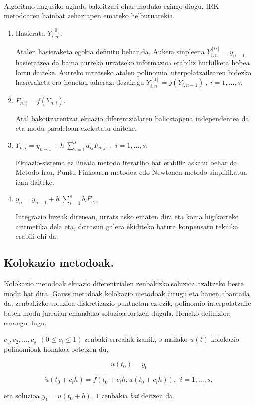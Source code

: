 \paragraph*{}Algoritmo nagusiko agindu bakoitzari ohar moduko egingo diogu, IRK metodoaren hainbat zehaztapen emateko helburuarekin.
\begin{enumerate}
\item Hasieratu  $Y_{i,n}^{[0]}$.

Atalen hasieraketa egokia definitu behar da. Aukera sinpleena $Y_{i,n}^{[0]}=y_{n-1}$ hasieratzea da baina aurreko urratseko informazioa erabiliz hurbilketa hobea lortu daiteke. Aurreko urratseko atalen polinomio interpolatzailearen bidezko hasieraketa era honetan adierazi dezakegu  $Y_{i,n}^{[0]}=g(Y_{i,n-1}) \ , \ i=1, \dots, s$.      

\item $F_{n,i}=f(Y_{n,i})$.

Atal bakoitzarentzat ekuazio diferentzialaren balioztapena independentea da eta modu paraleloan exekutatu daiteke.

\item   $Y_{n,i}=y_{n-1}+ h \ \sum\limits_{i=1}^{s} a_{ij} F_{n,j}  \ \ , \ \  i=1,\dots,s$.

Ekuazio-sistema ez lineala metodo iteratibo bat erabiliz askatu behar da. Metodo hau, Puntu Finkoaren metodoa edo Newtonen metodo sinplifikatua izan daiteke.  

\item $y_{n}=y_{n-1}+ h \ \sum\limits_{i=1}^{s} b_i F_{n,i} $\;

Integrazio luzeak direnean, urrats asko ematen dira eta koma higikorreko aritmetika dela eta, doitasun galera ekiditeko batura konpensatu teknika erabili ohi da.


\end{enumerate} 

\subsection{Kolokazio metodoak.}

Kolokazio metodoak ekuazio diferentzialen zenbakizko soluzioa azaltzeko beste modu bat dira. Gauss metodoak kolokazio metodoak ditugu eta hauen abantaila da, zenbakizko soluzioa diskretizazio puntuetan ez ezik, polinomio interpolatzaile batek modu jarraian emandako soluzioa lortzen dugula. Honako definizioa emango dugu,

\begin{definizioa}
$c_1,c_2,\dots,c_s \ \ (0\leq c_i \leq 1)$ zenbaki errealak izanik, $s$-mailako $u(t)$   kolokazio polinomioak honakoa betetzen du,

\[u(t_0)=y_0 \]

\[\dot{u}(t_0+c_ih)=f(t_0+c_i h, u(t_0+c_i h)), \ \ i=1,\dots,s,\] 

eta soluzioa $y_1=u(t_0+h)$.
$1$ zenbakia \emph{bat} deitzen da.
\end{definizioa}

